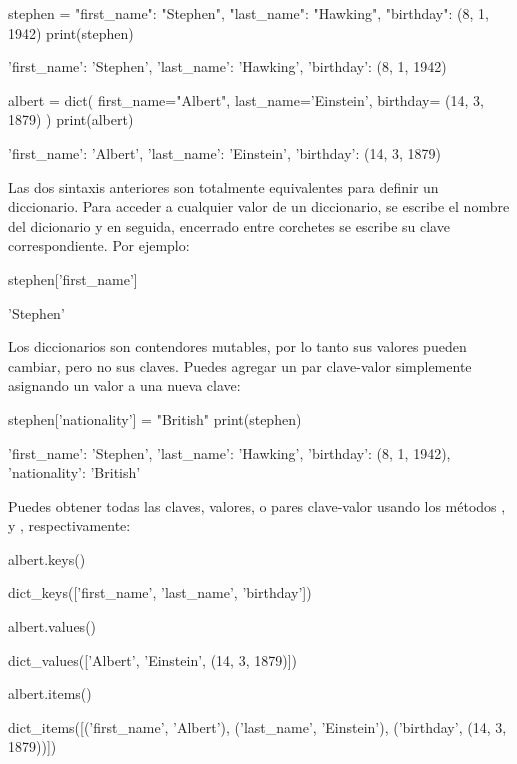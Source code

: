 \begin{pyin}
stephen = {
    "first_name": "Stephen", 
    "last_name": "Hawking", 
    "birthday": (8, 1, 1942)
    }
print(stephen)
\end{pyin}
\begin{pyprint}
{'first_name': 'Stephen', 'last_name': 'Hawking', 'birthday': (8, 1, 1942)}   
\end{pyprint}
\begin{pyin}
albert = dict(
    first_name="Albert", 
    last_name='Einstein',
    birthday= (14, 3, 1879) 
    )
print(albert)
\end{pyin}
\begin{pyprint}
{'first_name': 'Albert', 'last_name': 'Einstein', 'birthday': (14, 3, 1879)}
\end{pyprint}

Las dos sintaxis anteriores son totalmente equivalentes para definir un diccionario. Para acceder a cualquier valor de un diccionario, se escribe el nombre del dicionario y en seguida, encerrado entre corchetes se escribe su clave correspondiente. Por ejemplo:

\begin{pyin}
stephen['first_name']
\end{pyin}
\begin{pyout}
'Stephen'
\end{pyout}

Los diccionarios son contendores mutables, por lo tanto sus valores pueden cambiar, pero no sus claves. Puedes agregar un par clave-valor simplemente asignando un valor a una nueva clave:

\begin{pyin}
stephen['nationality'] = "British"
print(stephen)
\end{pyin}
\begin{pyprint}
{'first_name': 'Stephen', 'last_name': 'Hawking', 'birthday': (8, 1, 1942), 'nationality': 'British'}
\end{pyprint}

Puedes obtener todas las claves, valores, o pares clave-valor usando los métodos ,  y , respectivamente:

\begin{pyin}
albert.keys()
\end{pyin}
\begin{pyout}
dict_keys(['first_name', 'last_name', 'birthday'])
\end{pyout}

\begin{pyin}
albert.values()
\end{pyin}
\begin{pyout}
dict_values(['Albert', 'Einstein', (14, 3, 1879)])
\end{pyout}

\begin{pyin}
albert.items()
\end{pyin}
\begin{pyout}
dict_items([('first_name', 'Albert'), ('last_name', 'Einstein'), ('birthday', (14, 3, 1879))])
\end{pyout}